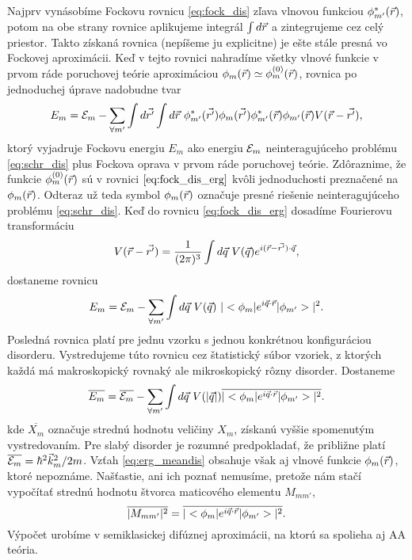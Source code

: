 Najprv vynásobíme Fockovu rovnicu \eqref{eq:fock_dis} zľava vlnovou funkciou $\phi^*_{m'}(\vec{r})$, potom na obe strany rovnice aplikujeme integrál $\int d \vec{r}$ a zintegrujeme cez celý priestor.
Takto získaná rovnica (nepíšeme ju explicitne) je ešte stále presná vo Fockovej aproximácii. Keď v tejto rovnici nahradíme všetky vlnové funkcie v prvom ráde poruchovej teórie aproximáciou
$\phi_m(\vec{r}) \simeq \phi_m^{(0)}(\vec{r})$, rovnica po jednoduchej úprave nadobudne tvar
\begin{equation}
 \label{eq:fock_dis_erg}
 E_m=\E_m-\sum_{\forall m'} \int d\vrp \int d\vr\ \phi^*_{m'}(\vrp) \phi_{m}(\vrp)\phi^*_{m'}(\vr)\phi_{m'}(\vr)V(\vr-\vrp) \text{,}
\end{equation}
ktorý vyjadruje Fockovu energiu $E_m$ ako energiu $\mathcal{E}_m$ neinteragujúceho problému \eqref{eq:schr_dis} plus Fockova oprava v prvom ráde poruchovej teórie. Zdôraznime, že funkcie
$\phi_m^{(0)}(\vec{r})$ sú v rovnici $\eqref{eq:fock_dis_erg}$  kvôli jednoduchosti preznačené na $\phi_m(\vec{r})$. Odteraz už teda symbol $\phi_m(\vec{r})$
označuje presné riešenie neinteragujúceho problému \eqref{eq:schr_dis}.
Keď do rovnicu \eqref{eq:fock_dis_erg} dosadíme Fourierovu transformáciu
\begin{equation}
 \label{eq:V_ft}
 V(\vr-\vrp)=\ftkvec{(\vr-\vrp)}{\vq}{V(\vq)}\text{,}
\end{equation}
dostaneme rovnicu
\begin{equation}
\label{eq:erg_V_ft}
 E_m=\E_m-\sum_{\forall m'} \int d\vq\ V(\vq) \ |\bra{\phi_m}e^{i\vq\cdot\vr}\ket{\phi_{m'}}|^2 \text{.}
\end{equation}
Posledná rovnica platí pre jednu vzorku s jednou konkrétnou konfiguráciou disorderu. Vystredujeme túto rovnicu cez štatistický súbor vzoriek, z ktorých
každá má makroskopický rovnaký ale mikroskopický rôzny disorder. Dostaneme
\begin{equation}
\label{eq:erg_meandis}
 \overline{E_m}=\overline{\E_m}-\sum_{\forall m'} \int d\vq\ V(|\vq|) \overline{|\bra{\phi_m}e^{i\vq\cdot\vr}\ket{\phi_{m'}}|^2} \text{.}
\end{equation}
kde $\overline{X_m}$ označuje strednú hodnotu veličiny $X_m$, získanú vyššie spomenutým vystredovaním. Pre slabý disorder je rozumné predpokladať, že približne platí $\overline{\mathcal{E}_m}= \hbar^2 \vec{k}_m^2/2m$.
Vzťah \eqref{eq:erg_meandis} obsahuje však aj vlnové funkcie
$\phi_m(\vec{r})$, ktoré nepoznáme. Našťastie,
ani ich poznať nemusíme, pretože nám stačí vypočítať strednú hodnotu štvorca maticového elementu $M_{mm'}$,
\begin{equation}
\label{eq:aa_matrix_element}
\overline{| M_{mm'}|^2} =\overline{|\bra{\phi_m}e^{i\vq\cdot\vr}\ket{\phi_{m'}}|^2} \text{.}
\end{equation}
Výpočet urobíme v semiklasickej difúznej aproximácii, na ktorú sa spolieha aj AA teória.


